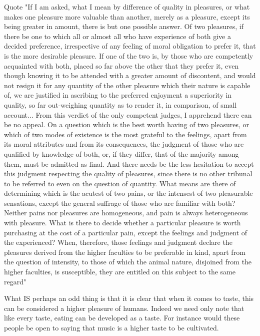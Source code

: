 \documentclass[12pt]{report}
\numberwithin{equation}{section}
\begin{document}
Quote "If I am asked, what I mean by difference of quality in pleasures, or what
makes one pleasure more valuable than another, merely as a pleasure, except its
being greater in amount, there is but one possible answer. Of two pleasures, if
there be one to which all or almost all who have experience of both give a
decided preference, irrespective of any feeling of moral obligation to prefer it,
that is the more desirable pleasure. If one of the two is, by those who are
competently acquainted with both, placed so far above the other that they prefer
it, even though knowing it to be attended with a greater amount of discontent,
and would not resign it for any quantity of the other pleasure which their nature
is capable of, we are justified in ascribing to the preferred enjoyment a
superiority in quality, so far out-weighing quantity as to render it, in comparison,
of small account...
From this verdict of the only competent judges, I apprehend there can be no
appeal. On a question which is the best worth having of two pleasures, or which
of two modes of existence is the most grateful to the feelings, apart from its
moral attributes and from its consequences, the judgment of those who are
qualified by knowledge of both, or, if they differ, that of the majority among
them, must be admitted as final. And there needs be the less hesitation to accept
this judgment respecting the quality of pleasures, since there is no other tribunal
to be referred to even on the question of quantity. What means are there of
determining which is the acutest of two pains, or the intensest of two pleasurable
sensations, except the general suffrage of those who are familiar with both?
Neither pains nor pleasures are homogeneous, and pain is always heterogeneous
with pleasure. What is there to decide whether a particular pleasure is worth
purchasing at the cost of a particular pain, except the feelings and judgment of
the experienced? When, therefore, those feelings and judgment declare the
pleasures derived from the higher faculties to be preferable in kind, apart from
the question of intensity, to those of which the animal nature, disjoined from the
higher faculties, is susceptible, they are entitled on this subject to the same
regard"

What IS perhaps an odd thing is that it is clear that when it comes to taste, this can be considered a higher pleasure of humans. Indeed we need only note that like every taste, eating can be developed as a taste. For instance would these people be open to saying that music is a higher taste to be cultivated. 
\end{document}
